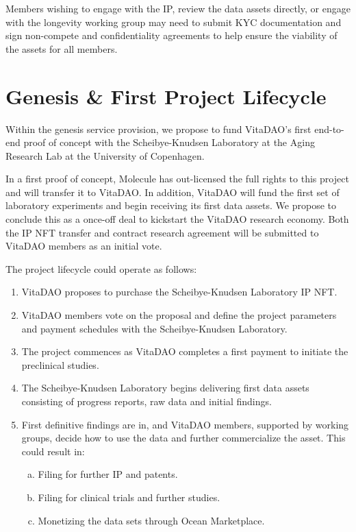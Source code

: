 \documentclass[12pt,letterpaper]{article}
\begin{document}
Members wishing to engage with the IP, review the data assets directly, or engage with the longevity working group may need to submit KYC documentation and sign non-compete and confidentiality agreements to help ensure the viability of the assets for all members.

\section{Genesis \& First Project Lifecycle}
Within the genesis service provision, we propose to fund VitaDAO’s first end-to-end proof of concept with the Scheibye-Knudsen Laboratory at the Aging Research Lab at the University of Copenhagen.

In a first proof of concept, Molecule has out-licensed the full rights to this project and will transfer it to VitaDAO. In addition, VitaDAO will fund the first set of laboratory experiments and begin receiving its first data assets. We propose to conclude this as a once-off deal to kickstart the VitaDAO research economy. Both the IP NFT transfer and contract research agreement will be submitted to VitaDAO members as an initial vote.

The project lifecycle could operate as follows:

\begin{enumerate}
\item VitaDAO proposes to purchase the Scheibye-Knudsen Laboratory IP NFT.
\item VitaDAO members vote on the proposal and define the project parameters and payment schedules with the Scheibye-Knudsen Laboratory.
\item The project commences as VitaDAO completes a first payment to initiate the preclinical studies.
\item The Scheibye-Knudsen Laboratory begins delivering first data assets consisting of progress reports, raw data and initial findings.
\item First definitive findings are in, and VitaDAO members, supported by working groups, decide how to use the data and further commercialize the asset. This could result in: 
\begin{enumerate}[a.]
\item Filing for further IP and patents.
\item Filing for clinical trials and further studies.
\item Monetizing the data sets through Ocean Marketplace.
\end{enumerate}
\end{enumerate}
\end{document}
